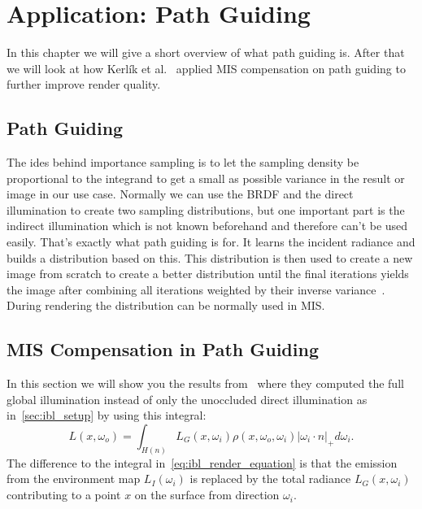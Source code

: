 \chapter{Application: Path Guiding}
\label{ch:application_pg}
In this chapter we will give a short overview of what path guiding is.
After that we will look at how Kerl\'ik et al.~\cite{Karlik2019} applied MIS compensation on path guiding to further improve render quality.


\section{Path Guiding}
\label{sec:path_guiding}
The ides behind importance sampling is to let the sampling density be proportional to the integrand
to get a small as possible variance in the result or image in our use case.
Normally we can use the BRDF and the direct illumination to create two sampling distributions,
but one important part is the indirect illumination which is not known beforehand and therefore can't be used easily.
That's exactly what path guiding is for.
It learns the incident radiance and builds a distribution based on this.
This distribution is then used to create a new image from scratch to create a better distribution
until the final iterations yields the image after combining all iterations weighted by their inverse variance~\cite{Vorba_2019}.
During rendering the distribution can be normally used in MIS.


\section{MIS Compensation in Path Guiding}
\label{sec:misc_path_guiding}
In this section we will show you the results from~\cite[Section~8-9]{Karlik2019}
where they computed the full global illumination instead of only the unoccluded direct illumination as in~\ref{sec:ibl_setup} by using this integral:
$$ L(x, \omega_o) = \int_{H(n)} L_G(x, \omega_i)\rho(x, \omega_o, \omega_i) |\omega_i \cdot n|_+ d\omega_i. $$
The difference to the integral in~\ref{eq:ibl_render_equation} is that the emission from the environment map $ L_I(\omega_i) $
is replaced by the total radiance $ L_G(x, \omega_i) $ contributing to a point $ x $ on the surface from direction $ \omega_i $.

